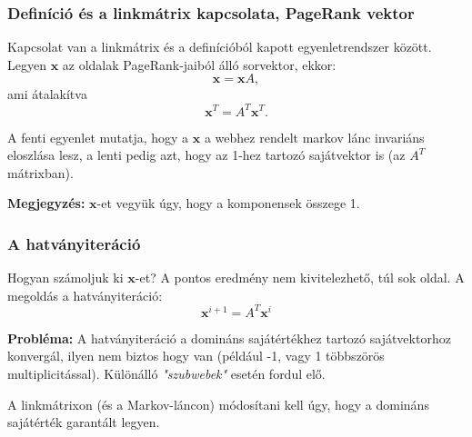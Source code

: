 \documentclass[]{beamer}
\newcommand{\bx}{\mathbf{x}}
\begin{document}
\begin{frame}
	\frametitle{Definíció és a linkmátrix kapcsolata, PageRank vektor}
	
	Kapcsolat van a linkmátrix és a definícióból kapott egyenletrendszer között. Legyen $\bx$ az oldalak PageRank-jaiból álló sorvektor, ekkor:
	\[ 
	\bx = \bx A, 
	\]
	ami átalakítva
	\[
	\bx^T = A^T \bx^T. 
	\]
	
	A fenti egyenlet mutatja, hogy a $\bx$ a webhez rendelt markov lánc invariáns eloszlása lesz, a lenti pedig azt, hogy az 1-hez
	tartozó sajátvektor is (az $A^T$ mátrixban).
	
	\bigskip
	\textbf{Megjegyzés:} $\bx$-et vegyük úgy, hogy a komponensek összege 1.
\end{frame}

\begin{frame}
	\frametitle{A hatványiteráció}
	
	Hogyan számoljuk ki $\bx$-et? A pontos eredmény nem kivitelezhető, túl sok oldal. A megoldás a hatványiteráció:
	\[ \bx^{i+1} = A^T \bx^i \]
	
	\textbf{Probléma:} A hatványiteráció a domináns sajátértékhez tartozó sajátvektorhoz konvergál, ilyen nem biztos hogy van (például -1, vagy 1 többszörös multiplicitással). Különálló \textit{"szubwebek"} esetén fordul elő.
	
	\bigskip
	A linkmátrixon (és a Markov-láncon) módosítani kell úgy, hogy a domináns sajátérték garantált legyen.
\end{frame}
\end{document}
